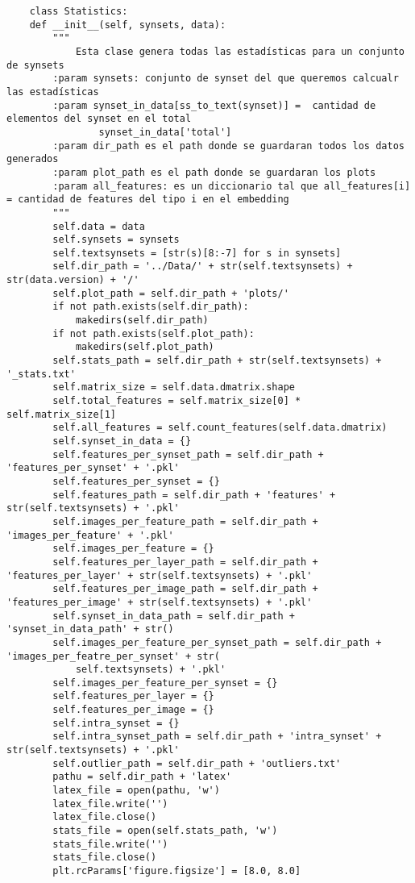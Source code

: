 \documentclass[12,twoside]{TFG-GM}
\theoremstyle{definition}
\theoremstyle{remark}
\begin{document}
\begin{verbatim}
	class Statistics:
    def __init__(self, synsets, data):
        """
            Esta clase genera todas las estadísticas para un conjunto de synsets
        :param synsets: conjunto de synset del que queremos calcualr las estadísticas
        :param synset_in_data[ss_to_text(synset)] =  cantidad de elementos del synset en el total
                synset_in_data['total']
        :param dir_path es el path donde se guardaran todos los datos generados
        :param plot_path es el path donde se guardaran los plots
        :param all_features: es un diccionario tal que all_features[i] = cantidad de features del tipo i en el embedding
        """
        self.data = data
        self.synsets = synsets
        self.textsynsets = [str(s)[8:-7] for s in synsets]
        self.dir_path = '../Data/' + str(self.textsynsets) + str(data.version) + '/'
        self.plot_path = self.dir_path + 'plots/'
        if not path.exists(self.dir_path):
            makedirs(self.dir_path)
        if not path.exists(self.plot_path):
            makedirs(self.plot_path)
        self.stats_path = self.dir_path + str(self.textsynsets) + '_stats.txt'
        self.matrix_size = self.data.dmatrix.shape
        self.total_features = self.matrix_size[0] * self.matrix_size[1]
        self.all_features = self.count_features(self.data.dmatrix)
        self.synset_in_data = {}
        self.features_per_synset_path = self.dir_path + 'features_per_synset' + '.pkl'
        self.features_per_synset = {}
        self.features_path = self.dir_path + 'features' + str(self.textsynsets) + '.pkl'
        self.images_per_feature_path = self.dir_path + 'images_per_feature' + '.pkl'
        self.images_per_feature = {}
        self.features_per_layer_path = self.dir_path + 'features_per_layer' + str(self.textsynsets) + '.pkl'
        self.features_per_image_path = self.dir_path + 'features_per_image' + str(self.textsynsets) + '.pkl'
        self.synset_in_data_path = self.dir_path + 'synset_in_data_path' + str()
        self.images_per_feature_per_synset_path = self.dir_path + 'images_per_featre_per_synset' + str(
            self.textsynsets) + '.pkl'
        self.images_per_feature_per_synset = {}
        self.features_per_layer = {}
        self.features_per_image = {}
        self.intra_synset = {}
        self.intra_synset_path = self.dir_path + 'intra_synset' + str(self.textsynsets) + '.pkl'
        self.outlier_path = self.dir_path + 'outliers.txt'
        pathu = self.dir_path + 'latex'
        latex_file = open(pathu, 'w')
        latex_file.write('')
        latex_file.close()
        stats_file = open(self.stats_path, 'w')
        stats_file.write('')
        stats_file.close()
        plt.rcParams['figure.figsize'] = [8.0, 8.0]


\end{verbatim}
\end{document}
